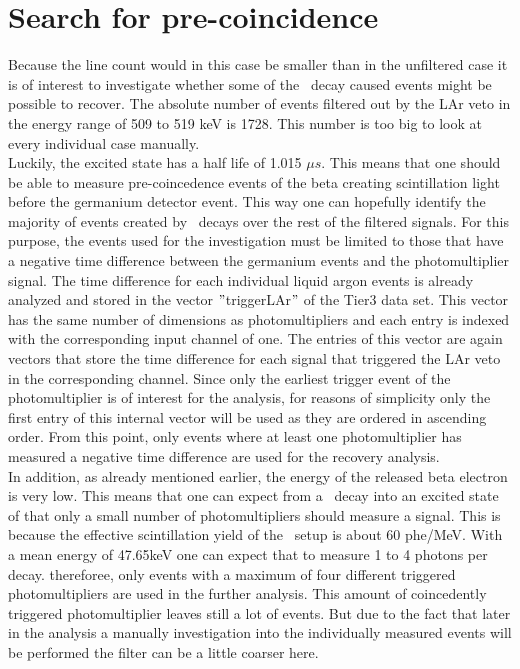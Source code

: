 \section{Search for pre-coincidence}
\label{sec:precoince}

Because the line count would in this case be smaller than in the unfiltered case it is of interest to investigate whether some of the \Kr\ decay caused events might be possible to recover.
The absolute number of events filtered out by the LAr veto in the energy range of 509 to 519 keV is 1728.
This number is too big to look at every individual case manually.
\\

Luckily, the excited  state has a half life of 1.015 \(\unit{\mu s}\).
This means that one should be able to measure pre-coincedence events of the beta creating scintillation light before the germanium detector event.
This way one can hopefully identify the majority of events created by \Kr\ decays over the rest of the filtered signals.
For this purpose, the events used for the investigation must be limited to those that have a negative time difference between the germanium events and the photomultiplier signal.
The time difference for each individual liquid argon events is already analyzed and stored in the vector $"$triggerLAr$"$ of the Tier3 data set.
This vector has the same number of dimensions as photomultipliers and each entry is indexed with the corresponding input channel of one.
The entries of this vector are again vectors that store the time difference for each signal that triggered the LAr veto in the corresponding channel.
Since only the earliest trigger event of the photomultiplier is of interest for the analysis,  for reasons of simplicity only the first entry of this internal vector will be used as they are ordered in ascending order.
From this point, only events where at least one photomultiplier has measured a negative time difference are used for the recovery analysis.
\\

In addition, as already mentioned earlier, the energy of the released beta electron is very low.
This means that one can expect from a \Kr\ decay into an excited state of  that only a small number of photomultipliers should measure a signal.
This is because the effective scintillation yield of the \gerda\ setup is about 60 phe/MeV.
With a mean energy of 47.65keV one can expect that to measure 1 to 4 photons per decay.
thereforee, only events with a maximum of four different triggered photomultipliers are used in the further analysis.
This amount of coincedently triggered photomultiplier leaves still a lot of events.
But due to the fact that later in the analysis a manually investigation into the individually measured events will be performed the filter can be a little coarser here.
\\

